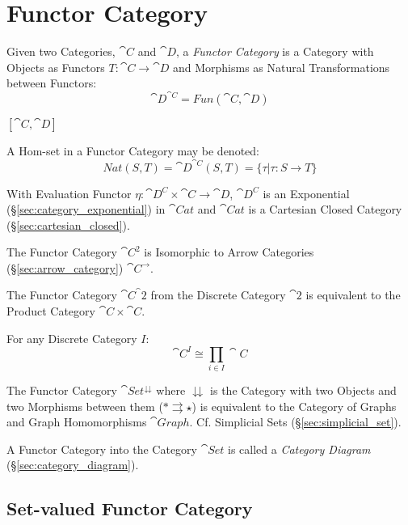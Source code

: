 \section{Functor Category}\label{sec:functor_category}

Given two Categories, $\cat{C}$ and $\cat{D}$, a \emph{Functor
  Category} is a Category with Objects as Functors $T : \cat{C}
\rightarrow \cat{D}$ and Morphisms as Natural Transformations
between Functors:
\[
  \cat{D}^{\cat{C}} = Fun(\cat{C},\cat{D})
\]

$[\cat{C},\cat{D}]$

A Hom-set in a Functor Category may be denoted:
\[
  Nat(S,T) = \cat{D}^{\cat{C}}(S,T) =
    \{ \tau | \tau : S \rightarrow T \}
\]

With Evaluation Functor $\eta : \cat{D^C} \times \cat{C} \rightarrow
\cat{D}$, $\cat{D^C}$ is an Exponential
(\S\ref{sec:category_exponential}) in $\cat{Cat}$ and $\cat{Cat}$ is a
Cartesian Closed Category (\S\ref{sec:cartesian_closed}).

The Functor Category $\cat{C^2}$ is Isomorphic to Arrow Categories
(\S\ref{sec:arrow_category}) $\cat{C}^\rightarrow$.

The Functor Category $\cat{C}^\cat{2}$ from the Discrete Category
$\cat{2}$ is equivalent to the Product Category $\cat{C} \times
\cat{C}$.

For any Discrete Category $I$:
\[
  \cat{C}^I \cong \prod_{i \in I} \cat{C}
\]

The Functor Category $\cat{Set}^\downdownarrows$ where
$\downdownarrows$ is the Category with two Objects and two Morphisms
between them ($* \rightrightarrows \star$) is equivalent to the
Category of Graphs and Graph Homomorphisms $\cat{Graph}$. Cf.
Simplicial Sets (\S\ref{sec:simplicial_set}).

A Functor Category into the Category $\cat{Set}$ is called a
\emph{Category Diagram} (\S\ref{sec:category_diagram}).



\subsection{Set-valued Functor Category}\label{sec:setvalued_functor}

